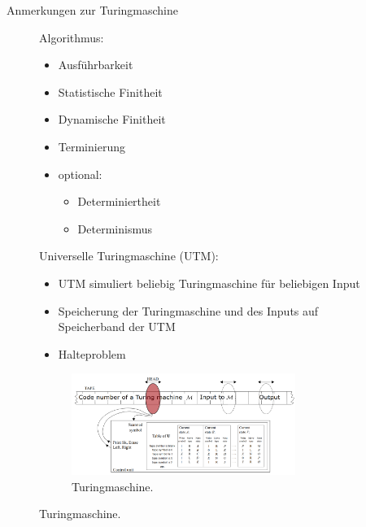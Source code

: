 \documentclass[aspectratio=1610, 9pt]{beamer}
\begin{document}
\begin{frame}{Anmerkungen zur Turingmaschine}
  \begin{figure}
    \begin{minipage}{0.29\textwidth}
      Algorithmus:
      \begin{itemize}
        \item Ausführbarkeit
        \item Statistische Finitheit
        \item Dynamische Finitheit
        \item Terminierung
        \item optional:
        \begin{itemize}
          \item[\bullet] Determiniertheit
          \item[\bullet] Determinismus
        \end{itemize}
      \end{itemize}
    \end{minipage}
    \hfill
    \begin{minipage}{0.69\textwidth}
      Universelle Turingmaschine (UTM):
      \begin{itemize}
        \item UTM simuliert beliebig Turingmaschine für beliebigen Input
        \item Speicherung der Turingmaschine und des Inputs auf Speicherband der UTM
        \item[\rightarrow] Halteproblem
      \end{itemize}
      \begin{figure}
        \includegraphics[width=0.8\textwidth]{images/UTM.png}
        \caption{Turingmaschine.}
      \end{figure}
    \end{minipage}
  \end{figure}
\end{frame}
\end{document}
